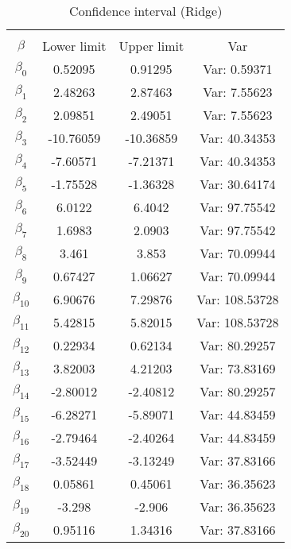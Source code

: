 \documentclass[a4paper]{article}
\begin{document}
\begin{table}[h!]
\caption{Confidence interval (Ridge)}
\begin{center}
\begin{tabular}{cccc}
	\hline
	\multicolumn{4}{c}{}\\
	$\beta$ & Lower limit & Upper limit & Var\\
	\hline
	$ \beta_{0} $ & 0.52095 & 0.91295 & Var: 0.59371 \\
	$ \beta_{1} $ & 2.48263 & 2.87463 & Var: 7.55623 \\
	$ \beta_{2} $ & 2.09851 & 2.49051 & Var: 7.55623 \\
	$ \beta_{3} $ & -10.76059 & -10.36859 & Var: 40.34353 \\
	$ \beta_{4} $ & -7.60571 & -7.21371 & Var: 40.34353 \\
	$ \beta_{5} $ & -1.75528 & -1.36328 & Var: 30.64174 \\
	$ \beta_{6} $ & 6.0122 & 6.4042 & Var: 97.75542 \\
	$ \beta_{7} $ & 1.6983 & 2.0903 & Var: 97.75542 \\
	$ \beta_{8} $ & 3.461 & 3.853 & Var: 70.09944 \\
	$ \beta_{9} $ & 0.67427 & 1.06627 & Var: 70.09944 \\
	$ \beta_{10} $ & 6.90676 & 7.29876 & Var: 108.53728 \\
	$ \beta_{11} $ & 5.42815 & 5.82015 & Var: 108.53728 \\
	$ \beta_{12} $ & 0.22934 & 0.62134 & Var: 80.29257 \\
	$ \beta_{13} $ & 3.82003 & 4.21203 & Var: 73.83169 \\
	$ \beta_{14} $ & -2.80012 & -2.40812 & Var: 80.29257 \\
	$ \beta_{15} $ & -6.28271 & -5.89071 & Var: 44.83459 \\
	$ \beta_{16} $ & -2.79464 & -2.40264 & Var: 44.83459 \\
	$ \beta_{17} $ & -3.52449 & -3.13249 & Var: 37.83166 \\
	$ \beta_{18} $ & 0.05861 & 0.45061 & Var: 36.35623 \\
	$ \beta_{19} $ & -3.298 & -2.906 & Var: 36.35623 \\
	$ \beta_{20} $ & 0.95116 & 1.34316 & Var: 37.83166 \\
\end{tabular}
\end{center}
\label{tab:ConIntRidge}
\end{table}
\end{document}
